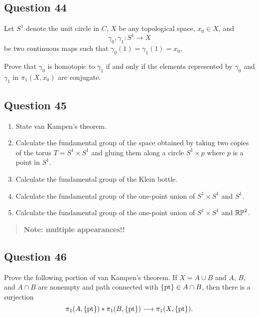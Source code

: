 \documentclass[12pt]{article}
\begin{document}
\hypertarget{question-44-3}{%
\subsection{Question 44}\label{question-44-3}}

Let \(S^1\) denote the unit circle in \(C\), \(X\) be any topological
space, \(x_0 \in X\), and \[\gamma_0, \gamma_1 : S^1 \to X\] be two
continuous maps such that \(\gamma_0 (1) = \gamma_1 (1) = x_0\).

Prove that \(\gamma_0\) is homotopic to \(\gamma_1\) if and only if the
elements represented by \(\gamma_0\) and \(\gamma_1\) in
\(\pi_1 (X, x_0 )\) are conjugate.

\hypertarget{question-45-3}{%
\subsection{Question 45}\label{question-45-3}}

\begin{enumerate}
\def\labelenumi{\alph{enumi}.}
\item
  State van Kampen's theorem.
\item
  Calculate the fundamental group of the space obtained by taking two
  copies of the torus \(T = S^1 \times S^1\) and gluing them along a
  circle \(S^1 \times {p}\) where \(p\) is a point in \(S^1\).
\item
  Calculate the fundamental group of the Klein bottle.
\item
  Calculate the fundamental group of the one-point union of
  \(S^1 \times S^1\) and \(S^1\).
\item
  Calculate the fundamental group of the one-point union of
  \(S^1 \times S^1\) and \({\mathbb{RP}}^2\).
\end{enumerate}

\begin{quote}
\textbf{Note: multiple appearances!!}
\end{quote}

\hypertarget{question-46-3}{%
\subsection{Question 46}\label{question-46-3}}

Prove the following portion of van Kampen's theorem. If \(X = A\cup B\)
and \(A\), \(B\), and \(A \cap B\) are nonempty and path connected with
\(\{\text{pt}\} \in A \cap B\), then there is a surjection \[
\pi_1 (A, \{\text{pt}\}) \ast \pi_1 (B, \{\text{pt}\}) \longrightarrow \pi_1 (X, \{\text{pt}\})
.\]
\end{document}

